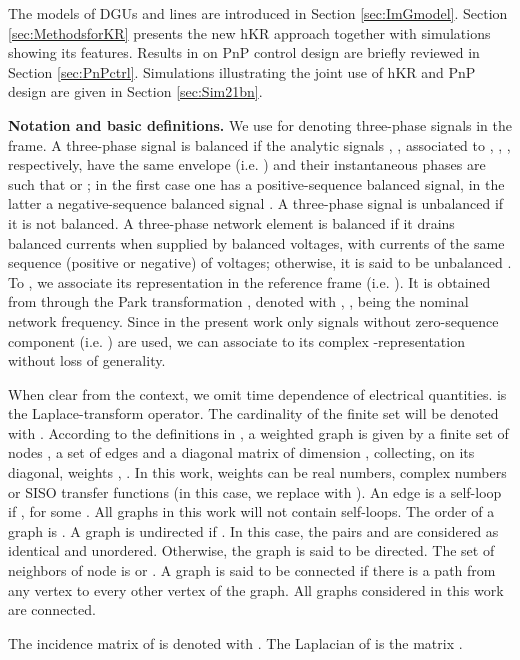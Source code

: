 \documentclass[a4paper]{article}
\theoremstyle{plain}
\begin{document}
The models of DGUs and lines are introduced in Section \ref{sec:ImGmodel}. Section \ref{sec:MethodsforKR} presents the new hKR approach together with simulations showing its features. Results in \cite{riverso2015plug} on PnP control design are briefly reviewed in Section \ref{sec:PnPctrl}. Simulations illustrating the joint use of hKR and PnP design are given in Section \ref{sec:Sim21bn}.


\textbf{Notation and basic definitions.} We use  for denoting three-phase signals in the  frame. 
A three-phase signal  is balanced if the analytic signals \cite{bracewell1965fourier} , ,  associated  to , , , respectively, have the same envelope (i.e. ) and their instantaneous phases are such that  or ; in the first case one has a positive-sequence balanced signal, in the latter a negative-sequence balanced signal \cite{cablea2014method}. A three-phase signal is unbalanced if it is not balanced. A three-phase network element is balanced if it drains balanced currents when supplied by balanced voltages, with currents of the same sequence (positive or negative) of voltages; otherwise, it is said to be unbalanced \cite{schiffer15_mod}.
To , we associate its representation in the   reference frame (i.e. ). It is obtained from  through the Park transformation \cite{park1929two}, denoted with , ,  being the nominal network frequency. Since in the present work only signals without zero-sequence component (i.e. ) are used, we can associate to  its complex -representation  without loss of generality.


When clear from the context, we omit time dependence of electrical quantities. 
 is the Laplace-transform operator.
The cardinality of the finite set  will be denoted with . According to the definitions in \cite{bollobas1998modern}, a weighted graph  is given by a finite set of nodes , a set of edges  and a diagonal matrix  of dimension , collecting, on its diagonal, weights , . In this work, weights can be real numbers, complex numbers or SISO transfer functions (in this case, we replace  with ). An edge  is a self-loop if , for some . All graphs in this work will not contain self-loops. The order of a graph is .
A graph is undirected if . In this case, the pairs  and  are considered as identical and unordered. Otherwise, the graph is said to be directed. The set of neighbors of node  is   or . A graph is said to be connected if there is a path from any vertex to every other vertex of the graph. All graphs considered in this work are connected.

The incidence matrix of  is denoted with  \cite{bollobas1998modern}. The Laplacian of  is the matrix . 
\end{document}
